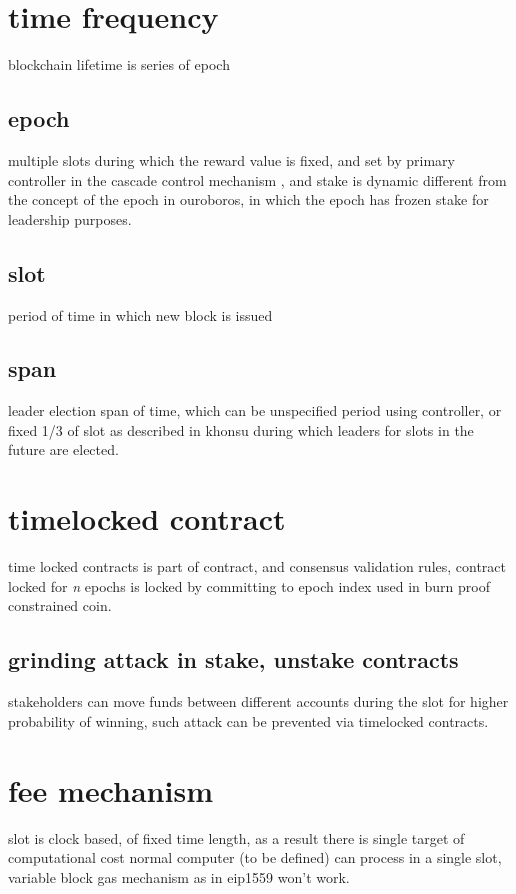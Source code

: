 \documentclass{article}
\begin{document}
\section {time frequency}
blockchain lifetime is series of epoch


\subsection {epoch}
multiple slots during which the reward value is fixed, and set by primary controller in the cascade control mechanism \cite{cascade}, and stake is dynamic different from the concept of the epoch in ouroboros, in which the epoch has frozen stake for leadership purposes.

\subsection {slot}
period of time in which new block is issued

\subsection {span}
leader election span of time, which can be unspecified period using controller, or fixed 1/3 of slot as described in khonsu \cite{khonsu} during which leaders for slots in the future are elected.

\section {timelocked contract}
time locked contracts is part of contract, and consensus validation rules, contract locked for \emph{n} epochs is locked by committing to epoch index used in burn proof constrained coin.

\label{timelocked}
\subsection {grinding attack in stake, unstake contracts}
stakeholders can move funds between different accounts during the slot for higher probability of winning, such attack can be prevented via timelocked contracts.


\section {fee mechanism}
slot is clock based, of fixed time length, as a result there is single target of computational cost normal computer (to be defined) can process in a single slot, variable block gas mechanism as in eip1559 won't work.
\end{document}
